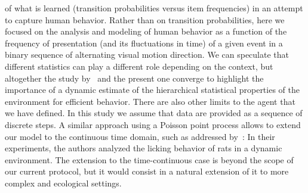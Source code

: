\documentclass[12pt,english]{article}%
\newcommand{\citet}[1]{\textcite{#1}}
\begin{document}
of what is learned (transition probabilities versus item frequencies)
in an attempt to capture human behavior.
Rather than on transition probabilities, here we focused on the analysis and modeling of human behavior as a function of the frequency of presentation (and its fluctuations in time) of a given event in a binary sequence of alternating visual motion direction. We can speculate that different statistics can play a different role depending on the context, but altogether the study by~\citet{Meyniel16} and the present one converge to highlight the importance of a dynamic estimate of the hierarchical statistical properties of the environment for efficient behavior.
There are also other limits to the agent that we have defined. In this study we assume that data are provided as a sequence of discrete steps.
A similar approach using a Poisson point process
allows to extend our model to the continuous time domain, such as addressed by~\citet{RadilloBrady2017}:
In their experiments, the authors analyzed the licking behavior of rats in a dynamic environment.
The extension to the time-continuous case is beyond the scope of our current protocol,
but it would consist in a natural extension of it
to more complex and ecological settings.
\end{document}
